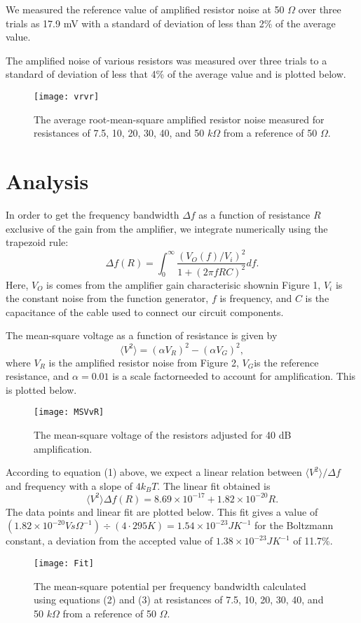 \documentclass{article}
\begin{document}
We measured the reference value of amplified resistor noise at
50 $\Omega$ over three trials as 17.9 mV with a standard of
deviation of less than 2\% of the average value.

The amplified noise of various resistors was measured over three
trials to a standard of deviation of less that 4\% of the
average value and is plotted below.

\begin{figure}[H] \texttt{[image: vrvr]}
\centering \caption{The average root-mean-square amplified
resistor noise measured for resistances of 7.5, 10, 20, 30, 40,
and 50 $k\Omega$ from a reference of 50 $\Omega$.} \end{figure}

\section{Analysis}

In order to get the frequency bandwidth $\Delta f$ as a function
of resistance $R$ exclusive of the gain from the amplifier, we
integrate numerically using the trapezoid rule: \begin{equation}
\Delta f(R)=\int_0^\infty \frac{(V_O(f)/V_i)^2}{1+(2\pi f R
C)^2} df. \end{equation} Here, $V_O$ is comes from the amplifier
gain characterisic shownin Figure 1, $V_i$ is the constant noise
from the function generator, $f$ is frequency, and $C$ is the
capacitance of the cable used to connect our circuit components.

The mean-square voltage as a function of resistance is given by
\begin{equation} \langle V^2\rangle=(\alpha V_R)^2-(\alpha
V_G)^2, \end{equation} where $V_R$ is the amplified resistor
noise from Figure 2, $V_G$is the reference resistance, and
$\alpha=0.01$ is a scale factorneeded to account for
amplification. This is plotted below.

\begin{figure}[H] \texttt{[image: MSVvR]}
\centering \caption{The mean-square voltage of the resistors
adjusted for 40 dB amplification.} \end{figure}

According to equation (1) above, we expect a linear relation
between $\langle V^2\rangle/ \Delta f$ and frequency with a
slope of $4 k_B T$. The linear fit obtained is \begin{equation}
{\langle V^2\rangle}{\Delta
f}(R)=8.69\times10^{-17}+1.82\times10^{-20} R. \end{equation}
The data points and linear fit are plotted below. This fit gives
a value of $(1.82\times10^{-20}V s
\Omega^{-1})\div(4\cdot295K)=1.54\times10^{-23}J K^{-1}$ for the
Boltzmann constant, a deviation from the accepted value of
$1.38\times10^{-23}J K^{-1}$ of 11.7\%. \begin{figure}[H]
\texttt{[image: Fit]} \centering
\caption{The mean-square potential per frequency bandwidth
calculated using equations (2) and (3) at resistances of 7.5,
10, 20, 30, 40, and 50 $k\Omega$ from a reference of 50
$\Omega$.} \end{figure}
\end{document}
